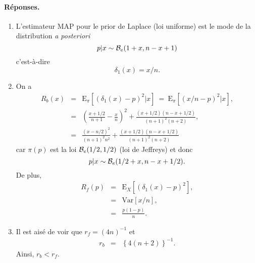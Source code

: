 \documentclass[10pt]{article}
\newcommand{\E}{\mbox{E}}
\newcommand{\V}{\mbox{Var}}
\newcommand{\1}{\mathbbm{1}}
\begin{document}
\paragraph{\bf R\'eponses.}
\begin{enumerate}
\item L'estimateur MAP pour le prior de Laplace (loi uniforme) est le mode de la distribution {\it a posteriori}
$$
p|x \sim {\cal{B}}_e(1+x,n-x+1)
$$
c'est-\`a-dire
$$
\delta_1(x) = x/n.
$$
\item On a 
\begin{eqnarray*}
R_b(x) &= & \E_{\pi}\left[(\delta_1(x)-p)^2|x\right] \ = \ \E_{\pi}\left[(x/n-p)^2|x\right], \\
& = & \left(\frac{x+1/2}{n+1} - \frac{x}{n}\right)^2 + \frac{(x+1/2)(n-x+1/2)}{(n+1)^2(n+2)}, \\
& = & \frac{(x-n/2)^2}{(n+1)^2 n^2} + \frac{(x+1/2)(n-x+1/2)}{(n+1)^2(n+2)}
\end{eqnarray*}
car $\pi(p)$ est la loi ${\cal{B}}_e(1/2,1/2)$ (loi de Jeffreys) et donc
$$
p|x \sim {\cal{B}}_e(1/2+x,n-x+1/2). 
$$
De plus, 
\begin{eqnarray*}
R_f(p) & = & \E_X\left[\left(\delta_1(x)- p\right)^2\right], \\
& = & \V\left[x/n\right], \\
& = & \frac{p(1-p)}{n}.
\end{eqnarray*}
\item Il est ais\'e de voir que $r_f =(4n)^{-1}$ et 
\begin{eqnarray*}
r_b  & = & \left\{4(n+2)\right\}^{-1}.
\end{eqnarray*}
Ainsi, $r_b< r_f$. 
\end{enumerate}
\end{document}

